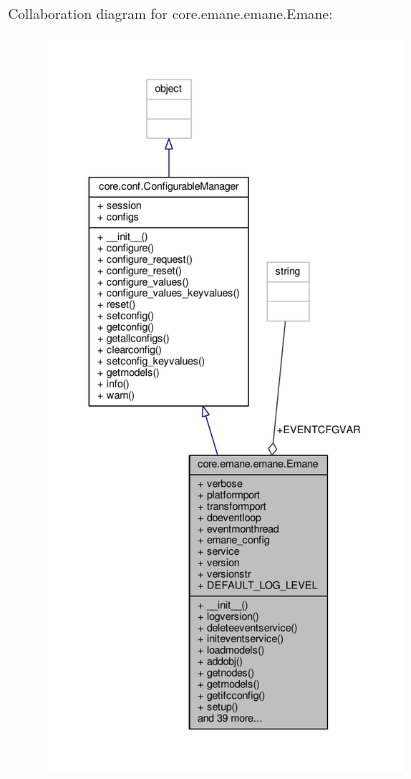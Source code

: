 Collaboration diagram for core.\+emane.\+emane.\+Emane\+:
\nopagebreak
\begin{figure}[H]
\begin{center}
\leavevmode
\includegraphics[height=550pt]{classcore_1_1emane_1_1emane_1_1_emane__coll__graph}
\end{center}
\end{figure}
